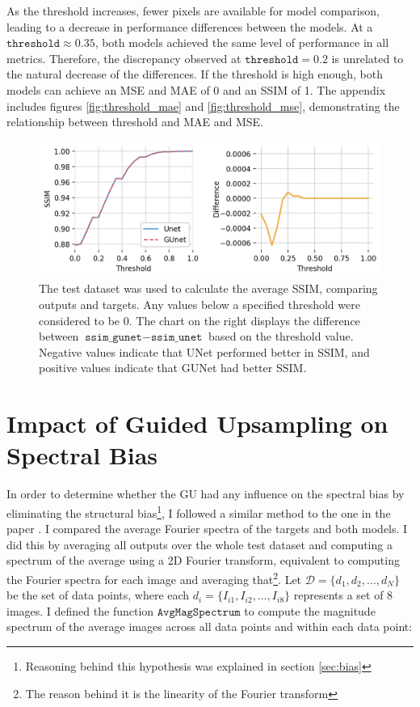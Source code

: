 As the threshold increases, fewer pixels are available for model comparison, leading to a decrease in performance differences between the models. At a $\texttt{threshold} \approx 0.35$, both models achieved the same level of performance in all metrics. Therefore, the discrepancy observed at $\texttt{threshold} = 0.2$ is unrelated to the natural decrease of the differences. If the threshold is high enough, both models can achieve an MSE and MAE of 0 and an SSIM of 1. The appendix includes figures \ref{fig:threshold_mae} and \ref{fig:threshold_mse}, demonstrating the relationship between threshold and \gls{MAE} and \gls{MSE}.


\begin{figure}[ht]
    \centering
    \includegraphics[width=\textwidth]{images/threshold_ssim.png}
    \caption[Higher intensity storm prediction metrics]{\label{fig:threshold_ssim}The test dataset was used to calculate the average \gls{SSIM}, comparing outputs and targets. Any values below a specified threshold were considered to be 0. The chart on the right displays the difference between $\texttt{ssim\_gunet} - \texttt{ssim\_unet}$ based on the threshold value.  Negative values indicate that UNet performed better in \gls{SSIM}, and positive values indicate that \gls{GUNet} had better \gls{SSIM}.}
\end{figure}

\section{Impact of Guided Upsampling on Spectral Bias}
\label{sec:impact_guided_upsampling}

In order to determine whether the \gls{GU} had any influence on the spectral bias by eliminating the structural bias\footnote{Reasoning behind this hypothesis was explained in section \ref{sec:bias}}, I followed a similar method to the one in the paper \cite{gunet}. I compared the average Fourier spectra of the targets and both models. I did this by averaging all outputs over the whole test dataset and computing a spectrum of the average using a 2D Fourier transform, equivalent to computing the Fourier spectra for each image and averaging that\footnote{The reason behind it is the linearity of the Fourier transform}. Let $\mathcal{D} = \{d_1, d_2, \dots, d_N\}$ be the set of data points, where each $d_i = \{I_{i1}, I_{i2}, \dots, I_{i8}\}$ represents a set of 8 images. I defined the function $\texttt{AvgMagSpectrum}$ to compute the magnitude spectrum of the average images across all data points and within each data point:


